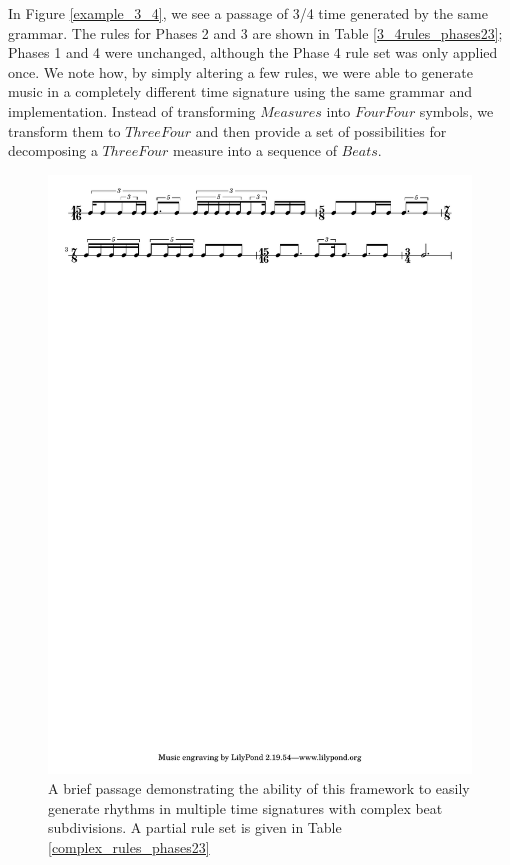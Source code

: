 \documentclass{article}
\begin{document}
In Figure \ref{example_3_4}, we see a passage of 3/4 time generated by the same grammar. The rules for Phases 2 and 3 are shown in Table \ref{3_4rules_phases23}; Phases 1 and 4 were unchanged, although the Phase 4 rule set was only applied once. We note how, by simply altering a few rules, we were able to generate music in a completely different time signature using the same grammar and implementation. Instead of transforming $Measures$ into $FourFour$ symbols, we transform them to $ThreeFour$ and then provide a set of possibilities for decomposing a $ThreeFour$ measure into a sequence of $Beats$.


\begin{figure}[t] %
\centering
\includegraphics[width=16cm]{complex.pdf}
\caption{A brief passage demonstrating the ability of this framework to easily generate rhythms in multiple time signatures with complex beat subdivisions. A partial rule set is given in Table \ref{complex_rules_phases23}}\label{example_complex}
\end{figure}
\end{document}
